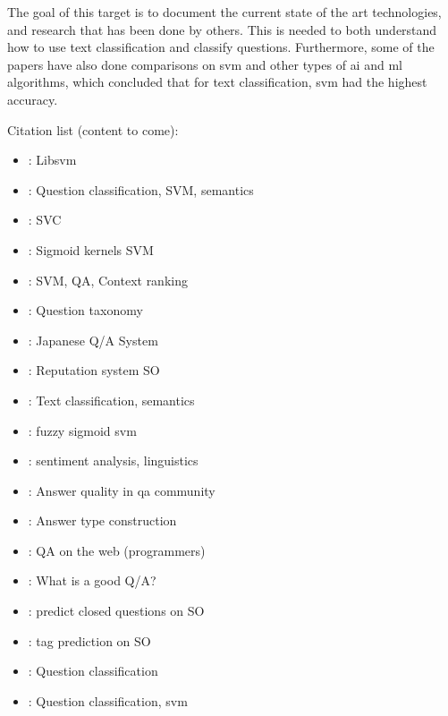 \label{chap:chapter2}
The goal of this target is to document the current state of the art technologies, and research 
that has been done by others. This is needed to both understand how to use text classification and 
classify questions. Furthermore, some of the papers have also done comparisons on \gls{svm} and 
other types of \gls{ai} and \gls{ml} algorithms, which concluded that for text classification, 
\gls{svm} had the highest accuracy.

Citation list (content to come):
\begin{itemize}
	\item \cite{ChangLin2011}: Libsvm
	\item \cite{XuZhouWang2012}: Question classification, SVM, semantics
	\item \cite{HsuChangLinEtAl2003}: SVC
	\item \cite{LinLin2003}: Sigmoid kernels SVM
	\item \cite{YenWuYangEtAl2013}: SVM, QA, Context ranking
	\item \cite{NielsenBuckinghamKnollEtAl2008}: Question taxonomy
	\item \cite{Isozaki2005}: Japanese Q/A System
	\item \cite{Movshovitz-AttiasMovshovitz-AttiasSteenkisteEtAl2013}: Reputation system SO
	\item \cite{BloehdornHotho2004}: Text classification, semantics
	\item \cite{HanDingLing-Feng2006}: fuzzy sigmoid svm
	\item \cite{ZhangWuLan2015}: sentiment analysis, linguistics
	\item \cite{ShahPomerantz2010}: Answer quality in qa community
	\item \cite{TobaAdrianiManurung2011}: Answer type construction
	\item \cite{TreudeBarzilayStorey2011}: QA on the web (programmers)
	\item \cite{SlowiaczekKlaymanShermanEtAl1992}: What is a good Q/A?
	\item \cite{LezinaKuznetsov2013}: predict closed questions on SO
	\item \cite{StanleyByrne2013}: tag prediction on SO
	\item \cite{HuangThintQin2008}: Question classification
	\item \cite{ZhangLee2003}: Question classification, svm

\end{itemize}
